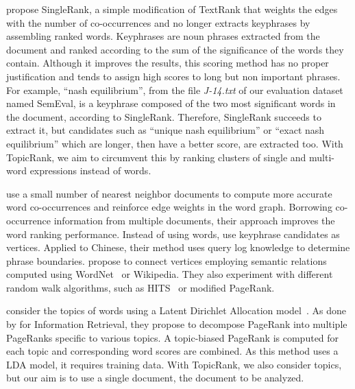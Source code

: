    propose SingleRank, a simple modification of
  TextRank that weights the edges with the number of co-occurrences and no
  longer extracts keyphrases by assembling ranked words. Keyphrases are noun
  phrases extracted from the document and ranked according to the sum of the
  significance of the words they contain. Although it improves the results, this
  scoring method has no proper justification and tends to assign high scores to
  long but non important phrases. For example, ``nash equilibrium'', from the
  file \textit{J-14.txt} of our evaluation dataset named SemEval, is a keyphrase
  composed of the two most significant words in the document, according to
  SingleRank. Therefore, SingleRank succeeds to extract it, but candidates such
  as ``unique nash equilibrium'' or ``exact nash equilibrium'' which are longer,
  then have a better score, are extracted too. With TopicRank, we aim to
  circumvent this by ranking clusters of single and multi-word expressions
  instead of words.

   use a small number of nearest neighbor documents
  to compute more accurate word co-occurrences and reinforce edge weights in the
  word graph. Borrowing co-occurrence information from multiple documents, their
  approach improves the word ranking performance. Instead of using words,
   use keyphrase candidates as vertices. Applied to
  Chinese, their method uses query log knowledge to determine phrase boundaries.
   propose to connect vertices employing
  semantic relations computed using WordNet~\cite{miller1995wordnet} or
  Wikipedia. They also experiment with different random walk algorithms, such as
  HITS~\cite{kleinberg1999hits} or modified PageRank.

   consider the topics of words using a Latent
  Dirichlet Allocation model~\cite[LDA]{blei2003lda}. As done by
   for Information Retrieval, they
  propose to decompose PageRank into multiple PageRanks specific to various
  topics. A topic-biased PageRank is computed for each topic and corresponding
  word scores are combined. As this method uses a LDA model, it requires
  training data. With TopicRank, we also consider topics, but our aim is to use
  a single document, the document to be analyzed.

